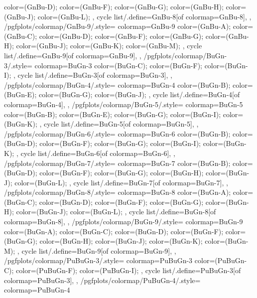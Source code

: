 {{{      color=(GnBu-D);
      color=(GnBu-F);
      color=(GnBu-G);
      color=(GnBu-H);
      color=(GnBu-J);
      color=(GnBu-L);
    },
    cycle list/.define={GnBu-8}{[of colormap=GnBu-8]},
  },
  /pgfplots/colormap/GnBu-9/.style={
    colormap={GnBu-9}{
      color=(GnBu-A);
      color=(GnBu-C);
      color=(GnBu-D);
      color=(GnBu-F);
      color=(GnBu-G);
      color=(GnBu-H);
      color=(GnBu-J);
      color=(GnBu-K);
      color=(GnBu-M);
    },
    cycle list/.define={GnBu-9}{[of colormap=GnBu-9]},
  },
  /pgfplots/colormap/BuGn-3/.style={
    colormap={BuGn-3}{
      color=(BuGn-C);
      color=(BuGn-F);
      color=(BuGn-I);
    },
    cycle list/.define={BuGn-3}{[of colormap=BuGn-3]},
  },
  /pgfplots/colormap/BuGn-4/.style={
    colormap={BuGn-4}{
      color=(BuGn-B);
      color=(BuGn-E);
      color=(BuGn-G);
      color=(BuGn-J);
    },
    cycle list/.define={BuGn-4}{[of colormap=BuGn-4]},
  },
  /pgfplots/colormap/BuGn-5/.style={
    colormap={BuGn-5}{
      color=(BuGn-B);
      color=(BuGn-E);
      color=(BuGn-G);
      color=(BuGn-I);
      color=(BuGn-K);
    },
    cycle list/.define={BuGn-5}{[of colormap=BuGn-5]},
  },
  /pgfplots/colormap/BuGn-6/.style={
    colormap={BuGn-6}{
      color=(BuGn-B);
      color=(BuGn-D);
      color=(BuGn-F);
      color=(BuGn-G);
      color=(BuGn-I);
      color=(BuGn-K);
    },
    cycle list/.define={BuGn-6}{[of colormap=BuGn-6]},
  },
  /pgfplots/colormap/BuGn-7/.style={
    colormap={BuGn-7}{
      color=(BuGn-B);
      color=(BuGn-D);
      color=(BuGn-F);
      color=(BuGn-G);
      color=(BuGn-H);
      color=(BuGn-J);
      color=(BuGn-L);
    },
    cycle list/.define={BuGn-7}{[of colormap=BuGn-7]},
  },
  /pgfplots/colormap/BuGn-8/.style={
    colormap={BuGn-8}{
      color=(BuGn-A);
      color=(BuGn-C);
      color=(BuGn-D);
      color=(BuGn-F);
      color=(BuGn-G);
      color=(BuGn-H);
      color=(BuGn-J);
      color=(BuGn-L);
    },
    cycle list/.define={BuGn-8}{[of colormap=BuGn-8]},
  },
  /pgfplots/colormap/BuGn-9/.style={
    colormap={BuGn-9}{
      color=(BuGn-A);
      color=(BuGn-C);
      color=(BuGn-D);
      color=(BuGn-F);
      color=(BuGn-G);
      color=(BuGn-H);
      color=(BuGn-J);
      color=(BuGn-K);
      color=(BuGn-M);
    },
    cycle list/.define={BuGn-9}{[of colormap=BuGn-9]},
  },
  /pgfplots/colormap/PuBuGn-3/.style={
    colormap={PuBuGn-3}{
      color=(PuBuGn-C);
      color=(PuBuGn-F);
      color=(PuBuGn-I);
    },
    cycle list/.define={PuBuGn-3}{[of colormap=PuBuGn-3]},
  },
  /pgfplots/colormap/PuBuGn-4/.style={
    colormap={PuBuGn-4}{
}}}
